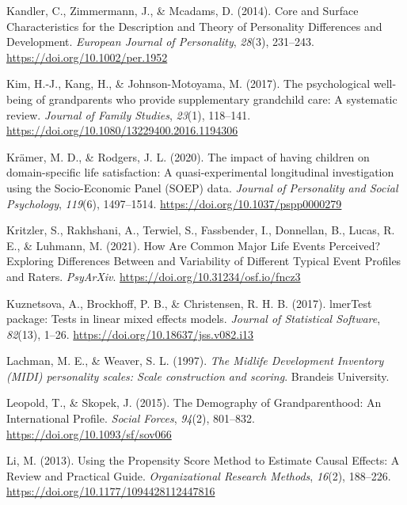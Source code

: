 \documentclass[
  english,
  man,floatsintext]{apa7}
\begin{document}
\leavevmode\hypertarget{ref-kandlerCoreSurfaceCharacteristics2014}{}%
Kandler, C., Zimmermann, J., \& Mcadams, D. (2014). Core and Surface Characteristics for the Description and Theory of Personality Differences and Development. \emph{European Journal of Personality}, \emph{28}(3), 231--243. \url{https://doi.org/10.1002/per.1952}

\leavevmode\hypertarget{ref-kimPsychologicalWellbeingGrandparents2017}{}%
Kim, H.-J., Kang, H., \& Johnson-Motoyama, M. (2017). The psychological well-being of grandparents who provide supplementary grandchild care: A systematic review. \emph{Journal of Family Studies}, \emph{23}(1), 118--141. \url{https://doi.org/10.1080/13229400.2016.1194306}

\leavevmode\hypertarget{ref-kramerImpactHavingChildren2020}{}%
Krämer, M. D., \& Rodgers, J. L. (2020). The impact of having children on domain-specific life satisfaction: A quasi-experimental longitudinal investigation using the Socio-Economic Panel (SOEP) data. \emph{Journal of Personality and Social Psychology}, \emph{119}(6), 1497--1514. \url{https://doi.org/10.1037/pspp0000279}

\leavevmode\hypertarget{ref-kritzlerHowAreCommon2021}{}%
Kritzler, S., Rakhshani, A., Terwiel, S., Fassbender, I., Donnellan, B., Lucas, R. E., \& Luhmann, M. (2021). How Are Common Major Life Events Perceived? Exploring Differences Between and Variability of Different Typical Event Profiles and Raters. \emph{PsyArXiv}. \url{https://doi.org/10.31234/osf.io/fncz3}

\leavevmode\hypertarget{ref-R-lmerTest}{}%
Kuznetsova, A., Brockhoff, P. B., \& Christensen, R. H. B. (2017). lmerTest package: Tests in linear mixed effects models. \emph{Journal of Statistical Software}, \emph{82}(13), 1--26. \url{https://doi.org/10.18637/jss.v082.i13}

\leavevmode\hypertarget{ref-lachmanMidlifeDevelopmentInventory1997}{}%
Lachman, M. E., \& Weaver, S. L. (1997). \emph{The Midlife Development Inventory (MIDI) personality scales: Scale construction and scoring}. Brandeis University.

\leavevmode\hypertarget{ref-leopoldDemographyGrandparenthoodInternational2015}{}%
Leopold, T., \& Skopek, J. (2015). The Demography of Grandparenthood: An International Profile. \emph{Social Forces}, \emph{94}(2), 801--832. \url{https://doi.org/10.1093/sf/sov066}

\leavevmode\hypertarget{ref-liUsingPropensityScore2013}{}%
Li, M. (2013). Using the Propensity Score Method to Estimate Causal Effects: A Review and Practical Guide. \emph{Organizational Research Methods}, \emph{16}(2), 188--226. \url{https://doi.org/10.1177/1094428112447816}
\end{document}
